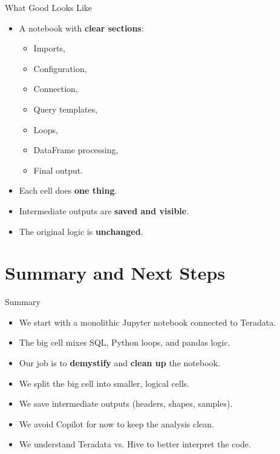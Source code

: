 \documentclass[aspectratio=169,11pt]{beamer}
\begin{document}
	\begin{frame}{What Good Looks Like}
		\begin{itemize}
			\item A notebook with \textbf{clear sections}:
			\begin{itemize}
				\item Imports,
				\item Configuration,
				\item Connection,
				\item Query templates,
				\item Loops,
				\item DataFrame processing,
				\item Final output.
			\end{itemize}
			\item Each cell does \textbf{one thing}.
			\item Intermediate outputs are \textbf{saved and visible}.
			\item The original logic is \textbf{unchanged}.
		\end{itemize}
	\end{frame}
	
	\section{Summary and Next Steps}
	
	\begin{frame}{Summary}
		\begin{itemize}
			\item We start with a monolithic Jupyter notebook connected to Teradata.
			\item The big cell mixes SQL, Python loops, and pandas logic.
			\item Our job is to \textbf{demystify} and \textbf{clean up} the notebook.
			\item We split the big cell into smaller, logical cells.
			\item We save intermediate outputs (headers, shapes, samples).
			\item We avoid Copilot for now to keep the analysis clean.
			\item We understand Teradata vs. Hive to better interpret the code.
		\end{itemize}
	\end{frame}
	
\end{document}
